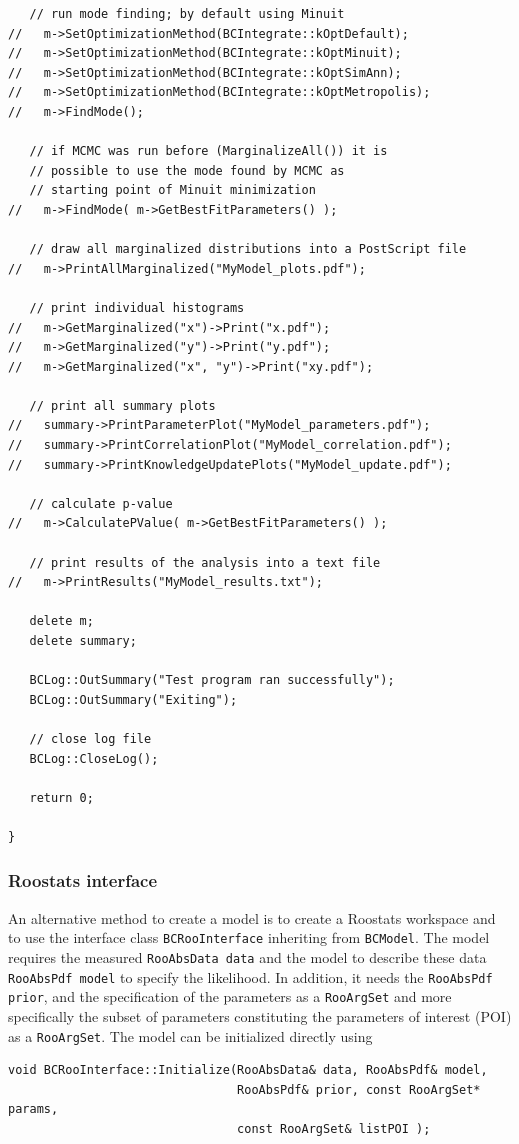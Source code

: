 \documentclass[11pt, a4paper]{article}
\begin{document}
\begin{verbatim}
   // run mode finding; by default using Minuit
//   m->SetOptimizationMethod(BCIntegrate::kOptDefault);
//   m->SetOptimizationMethod(BCIntegrate::kOptMinuit);
//   m->SetOptimizationMethod(BCIntegrate::kOptSimAnn);
//   m->SetOptimizationMethod(BCIntegrate::kOptMetropolis);
//   m->FindMode();

   // if MCMC was run before (MarginalizeAll()) it is
   // possible to use the mode found by MCMC as
   // starting point of Minuit minimization
//   m->FindMode( m->GetBestFitParameters() );

   // draw all marginalized distributions into a PostScript file
//   m->PrintAllMarginalized("MyModel_plots.pdf");

   // print individual histograms
//   m->GetMarginalized("x")->Print("x.pdf");
//   m->GetMarginalized("y")->Print("y.pdf");
//   m->GetMarginalized("x", "y")->Print("xy.pdf");

   // print all summary plots
//   summary->PrintParameterPlot("MyModel_parameters.pdf");
//   summary->PrintCorrelationPlot("MyModel_correlation.pdf");
//   summary->PrintKnowledgeUpdatePlots("MyModel_update.pdf");

   // calculate p-value
//   m->CalculatePValue( m->GetBestFitParameters() );

   // print results of the analysis into a text file
//   m->PrintResults("MyModel_results.txt");

   delete m;
   delete summary;

   BCLog::OutSummary("Test program ran successfully");
   BCLog::OutSummary("Exiting");

   // close log file
   BCLog::CloseLog();

   return 0;

}
\end{verbatim}

\subsubsection{Roostats interface}

An alternative method to create a model is to create a Roostats
workspace and to use the interface class \verb|BCRooInterface|
inheriting from \verb|BCModel|. The model requires the measured
\verb|RooAbsData data| and the model to describe these data
\verb|RooAbsPdf model| to specify the likelihood. In addition, it
needs the \verb|RooAbsPdf prior|, and the specification of the
parameters as a \verb|RooArgSet| and more specifically the subset of
parameters constituting the parameters of interest (POI) as a
\verb|RooArgSet|. The model can be initialized directly using
\begin{verbatim}
void BCRooInterface::Initialize(RooAbsData& data, RooAbsPdf& model,
                                RooAbsPdf& prior, const RooArgSet* params,
                                const RooArgSet& listPOI );
\end{verbatim}
\end{document}
